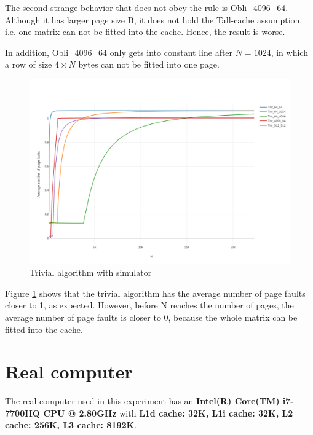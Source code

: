 \documentclass{article}
\begin{document}
The second strange behavior that does not obey the rule is Obli\_4096\_64. Although it has larger page size B, it does not hold the Tall-cache assumption, i.e. one matrix can not be fitted into the cache. Hence, the result is worse.

In addition, Obli\_4096\_64 only gets into constant line after $N=1024$, in which a row of size $4\times N$ bytes can not be fitted into one page.

\begin{figure}[h!]
\centering
\includegraphics[width=\textwidth]{NTIN066-cache-plot1-triv.png}
\caption{Trivial algorithm with simulator}
\label{fig:plot1-triv}
\end{figure}

Figure \ref{fig:plot1-triv} shows that the trivial algorithm has the average number of page faults closer to 1, as expected. However, before N reaches the number of pages, the average number of page faults is closer to 0, because the whole matrix can be fitted into the cache.

\section{Real computer}
The real computer used in this experiment has an \textbf{Intel(R) Core(TM) i7-7700HQ CPU @ 2.80GHz} with \textbf{L1d cache: 32K, L1i cache: 32K, L2 cache: 256K, L3 cache: 8192K}.
\end{document}
